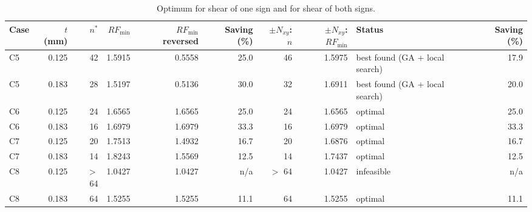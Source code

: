 \begin{table}[htbp]
\centering
\caption{Optimum for shear of one sign and for shear of both signs.}
\label{tab:shear_directions}
\begin{tabular}{lrrrrrrrlr}
\toprule
Case & $t$ (mm) & $n^{*}$ & $RF_{\min}$ & $RF_{\min}$ reversed & Saving (\%) & $\pm N_{xy}$: $n$ & $\pm N_{xy}$: $RF_{\min}$ & Status & Saving (\%) \\
\midrule
C5 & 0.125 & 42 & 1.5915 & 0.5558 & 25.0 & 46 & 1.5975 & best found (GA + local search) & 17.9 \\
C5 & 0.183 & 28 & 1.5197 & 0.5136 & 30.0 & 32 & 1.6911 & best found (GA + local search) & 20.0 \\
C6 & 0.125 & 24 & 1.6565 & 1.6565 & 25.0 & 24 & 1.6565 & optimal & 25.0 \\
C6 & 0.183 & 16 & 1.6979 & 1.6979 & 33.3 & 16 & 1.6979 & optimal & 33.3 \\
C7 & 0.125 & 20 & 1.7513 & 1.4932 & 16.7 & 20 & 1.6876 & optimal & 16.7 \\
C7 & 0.183 & 14 & 1.8243 & 1.5569 & 12.5 & 14 & 1.7437 & optimal & 12.5 \\
C8 & 0.125 & $>$ 64 & 1.0427 & 1.0427 & n/a & $>$ 64 & 1.0427 & infeasible & n/a \\
C8 & 0.183 & 64 & 1.5255 & 1.5255 & 11.1 & 64 & 1.5255 & optimal & 11.1 \\
\bottomrule
\end{tabular}
\end{table}
